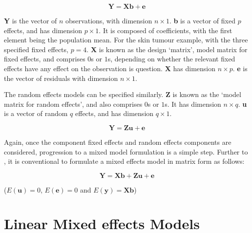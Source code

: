 \documentclass[12pt, a4paper]{report}
\theoremstyle{plain}
\theoremstyle{definition}
\theoremstyle{remark}
\begin{document}
\begin{equation}
\textbf{Y} = \textbf{Xb} + \textbf{e}
\end{equation}

\textbf{Y} is the vector of $n$ observations, with dimension $n
\times 1$. \textbf{b} is a vector of fixed $p$ effects, and has
dimension $p \times 1$. It is composed of coefficients, with the
first element being the population mean. For the skin tumour
example, with the three specified fixed effects, $p=4$. \textbf{X}
is known as the design `matrix', model matrix for fixed effects,
and comprises $0$s or $1$s, depending on whether the relevant
fixed effects have any effect on the observation is question.
\textbf{X} has dimension $n \times p$. \textbf{e} is the vector of
residuals with dimension $n \times 1$.

The random effects models can be specified similarly. \textbf{Z}
is known as the `model matrix for random effects', and also
comprises $0$s or $1$s. It has dimension $n \times q$. \textbf{u}
is a vector of random $q$ effects, and has dimension $q \times 1$.

\begin{equation}
\textbf{Y} = \textbf{Zu} + \textbf{e}
\end{equation}

Again, once the component fixed effects and random effects
components are considered, progression to a mixed model
formulation is a simple step. Further to \citet{LW82}, it is
conventional to formulate a mixed effects model in matrix form as
follows:

\begin{equation}
\textbf{Y} = \textbf{Xb} + \textbf{Zu} + \textbf{e}
\end{equation}

($E(\textbf{u})=0$, $E(\textbf{e})=0 $ and $E(\textbf{y}) =
\textbf{Xb}$)

\section{Linear Mixed effects Models}







\end{document}
